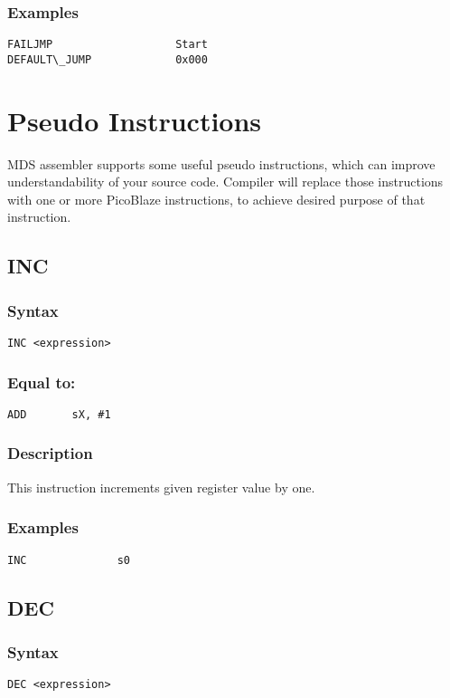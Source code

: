         \subsubsection{Examples}
            \verb'FAILJMP                   Start'\\
            \verb'DEFAULT\_JUMP             0x000'

\section{Pseudo Instructions}
    MDS assembler supports some useful pseudo instructions, which can improve understandability of your source code. Compiler will replace those instructions with one or more PicoBlaze instructions, to achieve desired purpose of that instruction.

    \subsection{INC}
        \subsubsection{Syntax}
            \verb'INC <expression>'

        \subsubsection{Equal to:}
            \verb'ADD       sX, #1'

        \subsubsection{Description}
            This instruction increments given register value by one.

        \subsubsection{Examples}
            \verb'INC              s0'

    \subsection{DEC}
        \subsubsection{Syntax}
            \verb'DEC <expression>'

